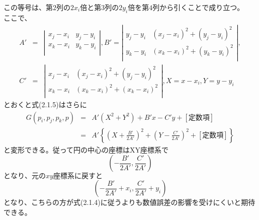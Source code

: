 \documentclass[../main]{jsarticle}
\begin{document}
この等号は、$第2列の2x_i倍と第3列の2y_i倍を第4列から引くことで成り立つ。$\\
ここで、
\begin{eqnarray*}
A'  & = &
\left |
\begin{array}{cc}
x_j - x_i & y_j - y_i \\
x_k - x_i & y_k -y_i \\
\end{array}
\right |,
B' =
\left |
\begin{array}{cc}
y_j - y_i & {(x_j - x_i)}^2 + {(y_j - y_i)}^2 \\
y_k - y_i & {(x_k - x_i)}^2 + {(y_k - y_i)}^2 \\
\end{array}
\right |, \\
C' & = &
\left |
\begin{array}{cc}
x_j - x_i & {(x_j - x_i)}^2 + {(y_j - y_i)}^2 \\
x_k - x_i & {(x_k - x_i)}^2 + {(x_k - x_i)}^2 \\
\end{array}
\right |,
X = x - x_i, Y = y - y_i
\end{eqnarray*}
とおくと式(2.1.5)はさらに
\begin{eqnarray}
G(p_i,p_j,p_k,p) & = & A'(X^2 + Y^2) + B'x - C'y +[定数項]　\nonumber \\
& = & A' \left\{ \left( X + \frac{B'}{2A'} \right)^2 + \left( Y - \frac{C'}{2A'} \right)^2 +[定数項] \right\}
\end{eqnarray}
と変形できる。従って円の中心の座標はXY座標系で
\begin{equation}
\left( -\frac{B'}{2A'}, \frac{C'}{2A'} \right)
\end{equation}
$となり、元のxy座標系に戻すと$
\begin{equation}
\left( -\frac{B'}{2A'} + x_i , \frac{C'}{2A'} + y_i \right)
\end{equation}
となり、こちらの方が式(2.1.4)に従うよりも数値誤差の影響を受けにくいと期待できる。\\
\end{document}
